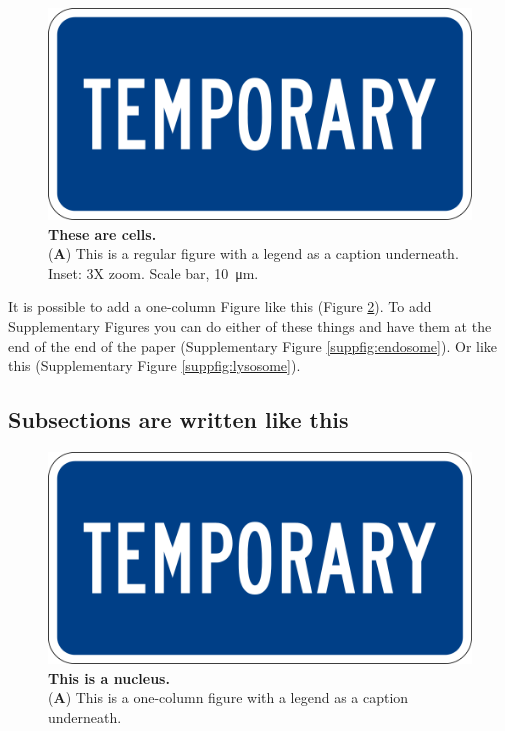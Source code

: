 \documentclass[vruler,JCS]{COB}
\begin{document}
\begin{figure}
\centering
\includegraphics[width=0.75\linewidth]{Figures/temp.png}
\caption{\textbf{These are cells.}\\
(\textbf{A}) This is a regular figure with a legend as a caption underneath. Inset: 3X zoom. Scale bar, \SI{10}{\micro\meter}.}
\label{fig:cells}
\end{figure}

It is possible to add a one-column Figure like this (Figure \ref{fig:nucleus}).
To add Supplementary Figures you can do either of these things and have them at the end of the end of the paper (Supplementary Figure \ref{suppfig:endosome}).
Or like this (Supplementary Figure \ref{suppfig:lysosome}).

\lipsum[10]

\subsection{Subsections are written like this}

\lipsum[11]

\begin{figure}
\centering
\includegraphics[width=0.75\linewidth]{Figures/temp.png}
\caption{\textbf{This is a nucleus.}\\
(\textbf{A}) This is a one-column figure with a legend as a caption underneath.}
\label{fig:nucleus}
\end{figure}
\end{document}
